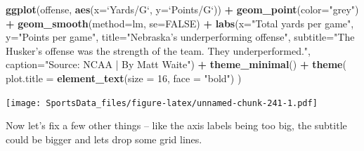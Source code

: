 \documentclass[]{book}
\newenvironment{Shaded}{\begin{snugshade}}{\end{snugshade}}
\newcommand{\KeywordTok}[1]{\textcolor[rgb]{0.13,0.29,0.53}{\textbf{#1}}}
\newcommand{\DataTypeTok}[1]{\textcolor[rgb]{0.13,0.29,0.53}{#1}}
\newcommand{\DecValTok}[1]{\textcolor[rgb]{0.00,0.00,0.81}{#1}}
\newcommand{\StringTok}[1]{\textcolor[rgb]{0.31,0.60,0.02}{#1}}
\newcommand{\OtherTok}[1]{\textcolor[rgb]{0.56,0.35,0.01}{#1}}
\newcommand{\OperatorTok}[1]{\textcolor[rgb]{0.81,0.36,0.00}{\textbf{#1}}}
\newcommand{\NormalTok}[1]{#1}
\begin{document}
\begin{Shaded}
\begin{Highlighting}[]
\KeywordTok{ggplot}\NormalTok{(offense, }\KeywordTok{aes}\NormalTok{(}\DataTypeTok{x=}\StringTok{`}\DataTypeTok{Yards/G}\StringTok{`}\NormalTok{, }\DataTypeTok{y=}\StringTok{`}\DataTypeTok{Points/G}\StringTok{`}\NormalTok{)) }\OperatorTok{+}\StringTok{ }
\StringTok{  }\KeywordTok{geom_point}\NormalTok{(}\DataTypeTok{color=}\StringTok{"grey"}\NormalTok{) }\OperatorTok{+}\StringTok{ }\KeywordTok{geom_smooth}\NormalTok{(}\DataTypeTok{method=}\NormalTok{lm, }\DataTypeTok{se=}\OtherTok{FALSE}\NormalTok{) }\OperatorTok{+}\StringTok{ }
\StringTok{  }\KeywordTok{labs}\NormalTok{(}\DataTypeTok{x=}\StringTok{"Total yards per game"}\NormalTok{, }\DataTypeTok{y=}\StringTok{"Points per game"}\NormalTok{, }\DataTypeTok{title=}\StringTok{"Nebraska's underperforming offense"}\NormalTok{, }\DataTypeTok{subtitle=}\StringTok{"The Husker's offense was the strength of the team. They underperformed."}\NormalTok{, }\DataTypeTok{caption=}\StringTok{"Source: NCAA | By Matt Waite"}\NormalTok{) }\OperatorTok{+}\StringTok{ }
\StringTok{  }\KeywordTok{theme_minimal}\NormalTok{() }\OperatorTok{+}\StringTok{ }
\StringTok{  }\KeywordTok{theme}\NormalTok{(}
    \DataTypeTok{plot.title =} \KeywordTok{element_text}\NormalTok{(}\DataTypeTok{size =} \DecValTok{16}\NormalTok{, }\DataTypeTok{face =} \StringTok{"bold"}\NormalTok{)}
\NormalTok{    ) }
\end{Highlighting}
\end{Shaded}

\texttt{[image: SportsData\_files/figure-latex/unnamed-chunk-241-1.pdf]}

Now let's fix a few other things -- like the axis labels being too big,
the subtitle could be bigger and lets drop some grid lines.
\end{document}
